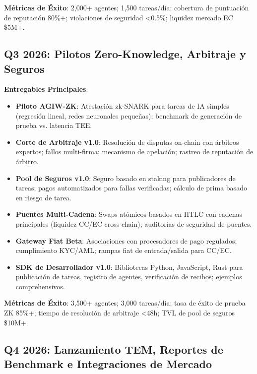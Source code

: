 \documentclass[11pt]{article}
\begin{document}
\textbf{Métricas de Éxito}: 2,000+ agentes; 1,500 tareas/día; cobertura de puntuación de reputación 80\%+; violaciones de seguridad <0.5\%; liquidez mercado EC \$5M+.

\subsection{Q3 2026: Pilotos Zero-Knowledge, Arbitraje y Seguros}

\textbf{Entregables Principales}:
\begin{itemize}[noitemsep]
  \item \textbf{Piloto AGIW-ZK}: Atestación zk-SNARK para tareas de IA simples (regresión lineal, redes neuronales pequeñas); benchmark de generación de prueba vs. latencia TEE.
  \item \textbf{Corte de Arbitraje v1.0}: Resolución de disputas on-chain con árbitros expertos; fallos multi-firma; mecanismo de apelación; rastreo de reputación de árbitro.
  \item \textbf{Pool de Seguros v1.0}: Seguro basado en staking para publicadores de tareas; pagos automatizados para fallas verificadas; cálculo de prima basado en riesgo de tarea.
  \item \textbf{Puentes Multi-Cadena}: Swaps atómicos basados en HTLC con cadenas principales (liquidez CC/EC cross-chain); auditorías de seguridad de puentes.
  \item \textbf{Gateway Fiat Beta}: Asociaciones con procesadores de pago regulados; cumplimiento KYC/AML; rampas fiat de entrada/salida para CC/EC.
  \item \textbf{SDK de Desarrollador v1.0}: Bibliotecas Python, JavaScript, Rust para publicación de tareas, registro de agentes, verificación de recibos; ejemplos comprehensivos.
\end{itemize}

\textbf{Métricas de Éxito}: 3,500+ agentes; 3,000 tareas/día; tasa de éxito de prueba ZK 85\%+; tiempo de resolución de arbitraje <48h; TVL de pool de seguros \$10M+.

\subsection{Q4 2026: Lanzamiento TEM, Reportes de Benchmark e Integraciones de Mercado}
\end{document}
